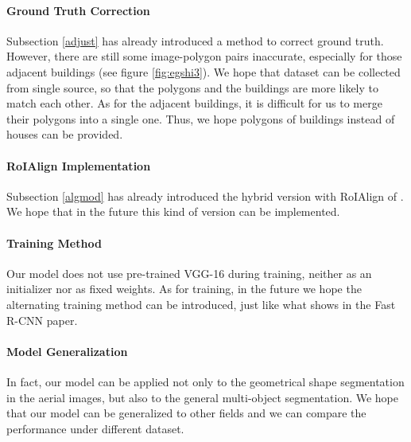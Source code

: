 \paragraph{Ground Truth Correction}
Subsection \ref{adjust} has already introduced a method to correct ground truth. However, there are still some image-polygon pairs inaccurate, especially for those adjacent buildings (see figure \ref{fig:egshi3}). We hope that dataset can be collected from single source, so that the polygons and the buildings are more likely to match each other. As for the adjacent buildings, it is difficult for us to merge their polygons into a single one. Thus, we hope polygons of buildings instead of houses can be provided.

\paragraph{RoIAlign Implementation}
Subsection \ref{algmod} has already introduced the hybrid version with RoIAlign of \modelnameshort. We hope that in the future this kind of version can be implemented.

\paragraph{Training Method}
Our model does not use pre-trained VGG-16 during training, neither as an initializer nor as fixed weights. As for training, in the future we hope the alternating training method can be introduced, just like what shows in the Fast R-CNN paper.

\paragraph{Model Generalization}
In fact, our model can be applied not only to the geometrical shape segmentation in the aerial images, but also to the general multi-object segmentation. We hope that our model \modelnameshort can be generalized to other fields and we can compare the performance under different dataset.

